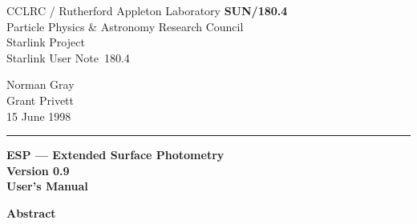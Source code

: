 \documentclass[twoside,11pt]{article}
\newcommand{\stardoccategory}  {Starlink User Note}
\newcommand{\stardocinitials}  {SUN}
\newcommand{\stardocnumber}    {180.4}
\newcommand{\stardocauthors}   {Norman Gray\\Grant Privett}
\newcommand{\stardocdate}      {15 June 1998}
\newcommand{\stardoctitle}     {ESP --- Extended Surface Photometry}
\newcommand{\stardocversion}   {Version 0.9}
\newcommand{\stardocmanual}    {User's Manual}
\newcommand{\stardocname}{\stardocinitials /\stardocnumber}
\newenvironment{latexonly}{}{}
\begin{document}
\thispagestyle{empty}

\begin{latexonly}
   CCLRC / {\sc Rutherford Appleton Laboratory} \hfill {\bf \stardocname}\\
   {\large Particle Physics \& Astronomy Research Council}\\
   {\large Starlink Project\\}
   {\large \stardoccategory\ \stardocnumber}
   \begin{flushright}
   \stardocauthors\\
   \stardocdate
   \end{flushright}
   \vspace{-4mm}
   \rule{\textwidth}{0.5mm}
   \vspace{5mm}
   \begin{center}
   {\Huge\bf  \stardoctitle \\ [2.5ex]}
   {\LARGE\bf \stardocversion \\ [4ex]}
   {\Huge\bf  \stardocmanual}
   \end{center}
   \vspace{5mm}

   \vspace{10mm}
   \begin{center}
      {\Large\bf Abstract}
   \end{center}
\end{latexonly}
\end{document}
